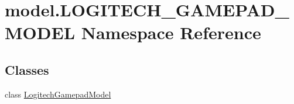 \hypertarget{namespacemodel_1_1LOGITECH__GAMEPAD__MODEL}{}\section{model.\+L\+O\+G\+I\+T\+E\+C\+H\+\_\+\+G\+A\+M\+E\+P\+A\+D\+\_\+\+M\+O\+D\+E\+L Namespace Reference}
\label{namespacemodel_1_1LOGITECH__GAMEPAD__MODEL}
\subsection*{Classes}
\begin{DoxyCompactItemize}
\item 
class \hyperlink{classmodel_1_1LOGITECH__GAMEPAD__MODEL_1_1LogitechGamepadModel}{Logitech\+Gamepad\+Model}
\end{DoxyCompactItemize}
